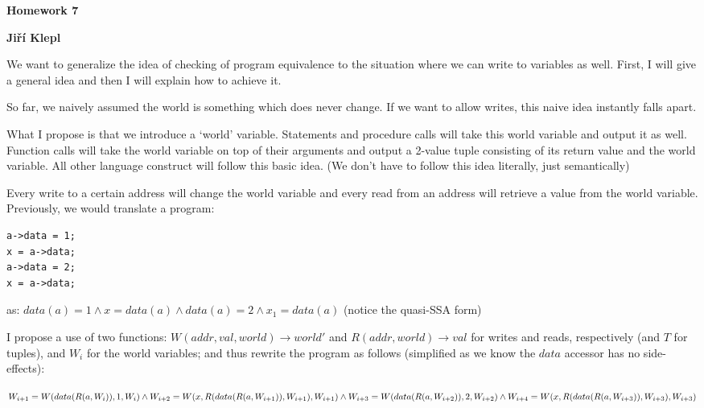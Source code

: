\documentclass[a4paper,12pt]{article} %
\begin{document}
\begin{center}
    {\Large \bf Homework 7}
    \vspace{2mm}

    {\bf Jiří Klepl}

\end{center}

\vspace{0.4cm}

We want to generalize the idea of checking of program equivalence to the situation where we can write to variables as well. First, I will give a general idea and then I will explain how to achieve it.

So far, we naively assumed the world is something which does never change. If we want to allow writes, this naive idea instantly falls apart.

What I propose is that we introduce a `world' variable. Statements and procedure calls will take this world variable and output it as well. Function calls will take the world variable on top of their arguments and output a 2-value tuple consisting of its return value and the world variable. All other language construct will follow this basic idea. (We don't have to follow this idea literally, just semantically)

Every write to a certain address will change the world variable and every read from an address will retrieve a value from the world variable. Previously, we would translate a program:

\begin{lstlisting}
a->data = 1;
x = a->data;
a->data = 2;
x = a->data;
\end{lstlisting}

as: $data(a) = 1 \land x = data(a) \land data(a) = 2 \land x_1 = data(a)$ (notice the quasi-SSA form)

I propose a use of two functions: $W(addr, val, world) \to world'$ and $R(addr, world) \to val$ for writes and reads, respectively (and $T$ for tuples), and $W_i$ for the world variables; and thus rewrite the program as follows (simplified as we know the $data$ accessor has no side-effects):

$W_{i+1} = W(data(R(a, W_i)), 1, W_i) \land \\
 W_{i+2} = W(x, R(data(R(a, W_{i+1})), W_{i+1}), W_{i+1}) \land \\
 W_{i+3} = W(data(R(a, W_{i+2})), 2, W_{i+2}) \land \\
 W_{i+4} = W(x, R(data(R(a, W_{i+3})), W_{i+3}), W_{i+3})$
\end{document}
